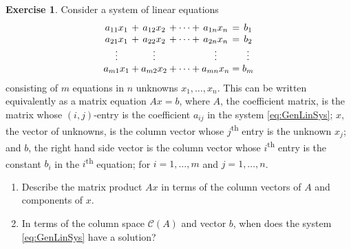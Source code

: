 \documentclass[svgnames]{article}
\theoremstyle{definition}
\newtheorem{Exercise}{Exercise}[section]
\theoremstyle{remark}
\newcommand{\newterm}[1]{{\color{alertcolor} #1}}
\renewcommand{\th}{\textsuperscript{th}\xspace}
\begin{document}
\begin{Exercise}
Consider a system of linear equations
\begin{align}
\begin{array}{@{}*{7}{c@{}}}
	a_{11} x_1 & {}+{} & a_{12} x_2 & {}+ \cdots +{} & a_{1n} x_n & {}={} & b_1\\
	a_{21} x_1 & {}+{} & a_{22} x_2 & {}+ \cdots +{} & a_{2n} x_n & {}={} & b_2\\
	\vdots     &       & \vdots     &                & \vdots     &       & \vdots\\
	a_{m1} x_1 & {}+{} & a_{m2} x_2 & {}+ \cdots +{} & a_{mn} x_n & {}={} & b_m
\end{array} \label{eq:GenLinSys}
\end{align}
consisting of $m$ equations in $n$ unknowns $x_1, \ldots, x_n$. This can be written equivalently as a matrix equation $Ax = b$, where $A$, the \newterm{coefficient matrix}, is the matrix whose $(i,j)$-entry is the coefficient $a_{ij}$ in the system \eqref{eq:GenLinSys}; $x$, the \newterm{vector of unknowns}, is the column vector whose $j$\th entry is the unknown $x_j$; and $b$, the \newterm{right hand side vector} is the column vector whose $i$\th entry is the constant $b_i$ in the $i$\th equation; for $i = 1, \ldots, m$ and $j = 1, \ldots, n$.
\begin{enumerate}
\item Describe the matrix product $Ax$ in terms of the column vectors of $A$ and components of $x$.
\item In terms of the column space $\mathcal{C}(A)$ and vector $b$, when does the system \eqref{eq:GenLinSys} have a solution?
\end{enumerate}
\end{Exercise}

%
\end{document}
